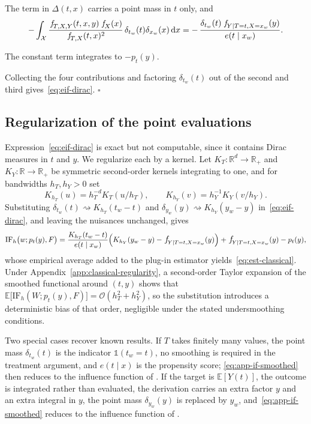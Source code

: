 \documentclass[11pt]{article}
\theoremstyle{plain}
\theoremstyle{definition}
\theoremstyle{remark}
\newcommand{\pE}{\ensuremath{\mathbb{E}}}
\newcommand{\R}{\mathbb{R}}
\newcommand{\cX}{\ensuremath{\mathcal{X}}}
\newcommand{\pf}[1]{\ensuremath{\,\mathlarger{\textit{f}}_{#1}}}
\newcommand{\Indi}{\ensuremath{\mathds{1}}}
\newcommand{\cO}{\mathcal{O}}
\newcommand{\dd}{\,\mathrm{d}}
\newcommand{\IF}{\mathrm{IF}}
\newcommand{\gps}{e}
\begin{document}
The term in $\Delta(t,x)$ carries a point mass in $t$ only, and
\[
-\int_{\cX} \frac{\pf{T,X,Y}(t,x,y)\,\pf{X}(x)}{\pf{T,X}(t,x)^2}\,
\delta_{t_w}(t)\delta_{x_w}(x)\dd x
= -\,\frac{\delta_{t_w}(t)\,\pf{Y \mid T=t,X=x_w}(y)}{\gps(t \mid x_w)} .
\]

The constant term integrates to $-p_t(y)$.

Collecting the four contributions and factoring $\delta_{t_w}(t)$ out of the second and
third gives~\eqref{eq:eif-dirac}. \hfill$\square$

\subsection{Regularization of the point evaluations}
\label{app:classical-kernels}

Expression~\eqref{eq:eif-dirac} is exact but not computable, since it contains Dirac
measures in $t$ and $y$. We regularize each by a kernel. Let $K_T : \R^{d} \to \R_+$ and
$K_Y : \R \to \R_+$ be symmetric second-order kernels integrating to one, and for
bandwidths $h_T, h_Y > 0$ set
\begin{equation}
K_{h_T}(u) = h_T^{-d} K_T(u/h_T), \qquad
K_{h_Y}(v) = h_Y^{-1} K_Y(v/h_Y).
\label{eq:kernels}
\end{equation}
Substituting $\delta_{t_w}(t) \rightsquigarrow K_{h_T}(t_w - t)$ and
$\delta_{y_w}(y) \rightsquigarrow K_{h_Y}(y_w - y)$ in~\eqref{eq:eif-dirac}, and leaving
the nuisances unchanged, gives
\begin{equation}
\IF_{h}\big(w;p_t(y),F\big)
= \frac{K_{h_T}(t_w-t)}{\gps(t \mid x_w)}
\Big( K_{h_Y}(y_w-y) - \pf{Y \mid T=t,X=x_w}(y) \Big)
+ \pf{Y \mid T=t,X=x_w}(y) - p_t(y),
\label{eq:app-if-smoothed}
\end{equation}
whose empirical average added to the plug-in estimator yields~\eqref{eq:est-classical}.
Under Appendix~\ref{app:classical-regularity}, a second-order Taylor expansion of the
smoothed functional around $(t,y)$ shows that
$\pE\big[\IF_h(W;p_t(y),F)\big] = \cO(h_T^2 + h_Y^2)$, so the substitution introduces a
deterministic bias of that order, negligible under the stated undersmoothing conditions.

Two special cases recover known results. If $T$ takes finitely many values, the point
mass $\delta_{t_w}(t)$ is the indicator $\Indi(t_w = t)$, no smoothing is required in the
treatment argument, and $\gps(t \mid x)$ is the propensity score; \eqref{eq:app-if-smoothed}
then reduces to the influence function of \citet{kennedy2023density}. If the target is
$\pE[Y(t)]$, the outcome is integrated rather than evaluated, the derivation carries an
extra factor $y$ and an extra integral in $y$, the point mass $\delta_{y_w}(y)$ is
replaced by $y_w$, and~\eqref{eq:app-if-smoothed} reduces to the influence function of
\citet{kennedy2017continuous}.
\end{document}
